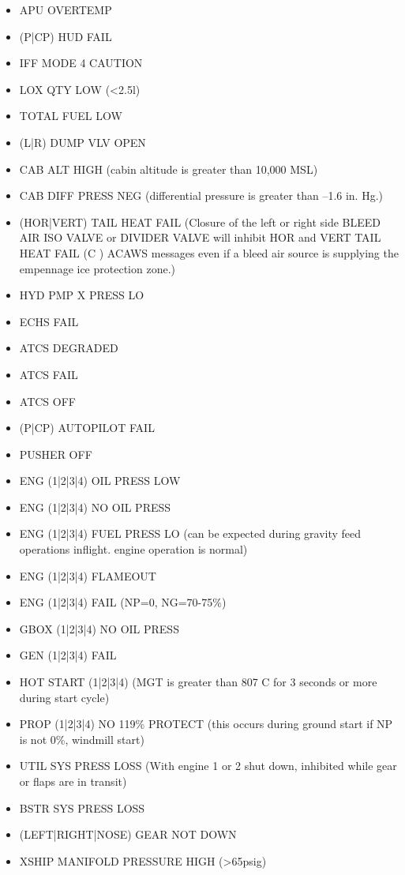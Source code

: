 \begin{itemize}
\item APU OVERTEMP
\item (P|CP) HUD FAIL
\item IFF MODE 4 CAUTION
\item LOX QTY LOW (<2.5l)
\item TOTAL FUEL LOW
\item (L|R) DUMP VLV OPEN
\item CAB ALT HIGH (cabin altitude is greater than 10,000 MSL)
\item CAB DIFF PRESS NEG (differential pressure is greater than –1.6 in. Hg.)
\item (HOR|VERT) TAIL HEAT FAIL (Closure of the left or right side BLEED AIR ISO VALVE or DIVIDER VALVE will inhibit HOR and VERT TAIL HEAT FAIL (C )  ACAWS messages even if a bleed air source is supplying the empennage ice protection zone.)
\item HYD PMP X PRESS LO
\item ECHS FAIL
\item ATCS DEGRADED
\item ATCS FAIL
\item ATCS OFF
\item (P|CP) AUTOPILOT FAIL
\item PUSHER OFF
\item ENG (1|2|3|4) OIL PRESS LOW
\item ENG (1|2|3|4) NO OIL PRESS
\item ENG (1|2|3|4) FUEL PRESS LO (can be expected during gravity feed operations inflight. engine operation is normal)
\item ENG (1|2|3|4) FLAMEOUT
\item ENG (1|2|3|4) FAIL (NP=0, NG=70-75\%)
\item GBOX (1|2|3|4) NO OIL PRESS
\item GEN (1|2|3|4) FAIL
\item HOT START (1|2|3|4) (MGT is greater than 807 C for 3 seconds or more during start cycle)
\item PROP (1|2|3|4) NO 119\% PROTECT (this occurs during ground start if NP is not 0\%, windmill start)
\item UTIL SYS PRESS LOSS (With engine 1 or 2 shut down, inhibited while gear or flaps are in transit)
\item BSTR SYS PRESS LOSS
\item (LEFT|RIGHT|NOSE) GEAR NOT DOWN
\item XSHIP MANIFOLD PRESSURE HIGH (>65psig)
\end{itemize}

